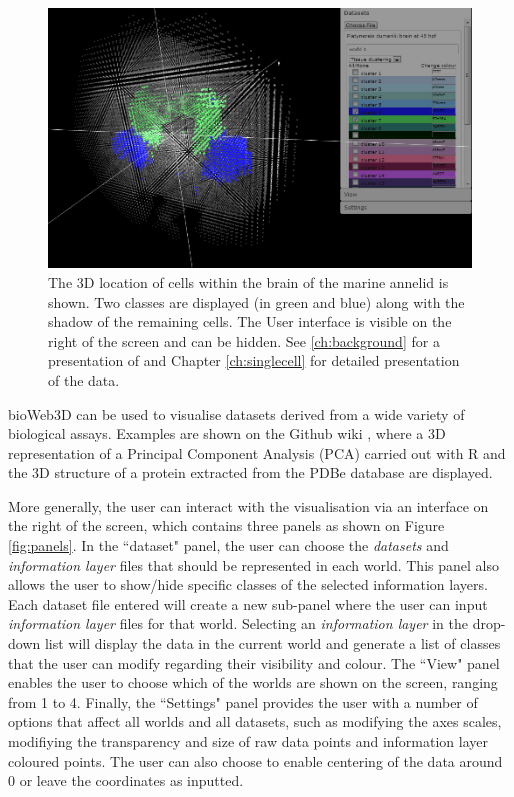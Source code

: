 	\begin{figure}[h]
\centerline{\includegraphics[width=\linewidth]{gfx/chapter3/bioweb3d.png}}
\caption{The 3D location of cells within the brain of the marine annelid \platyfull{} is shown. Two classes are displayed (in green and blue) along with the shadow of the remaining cells. The User interface is visible on the right of the screen and can be hidden. See \ref{ch:background} for a presentation of \platy{} and Chapter \ref{ch:singlecell} for detailed presentation of the data.}\label{fig:bioweb3d}
	\end{figure}

	bioWeb3D can be used to visualise datasets derived from a wide variety of biological assays. Examples are shown on the Github wiki \cite{github}, where a 3D representation of a Principal Component Analysis (PCA) carried out with R and the 3D structure of a protein extracted from the PDBe database are displayed.
	
	More generally, the user can interact with the visualisation via an interface on the right of the screen, which contains three panels as shown on Figure \ref{fig:panels}. In the ``dataset" panel, the user can choose the {\it{datasets}} and {\it{information layer}} files that should be represented in each world. This panel also allows the user to show/hide specific classes of the selected information layers. Each dataset file entered will create a new sub-panel where the user can input {\it{information layer}} files for that world. Selecting an {\it{information layer}} in the drop-down list will display the data in the current world and generate a list of classes that the user can modify regarding their visibility and colour. The ``View" panel enables the user to choose which of the worlds are shown on the screen, ranging from 1 to 4. Finally, the ``Settings" panel provides the user with a number of options that affect all worlds and all datasets, such as modifying the axes scales, modifiying the transparency and size of raw data points and information layer coloured points. The user can also choose to enable centering of the data around 0 or leave the coordinates as inputted.\\
	
